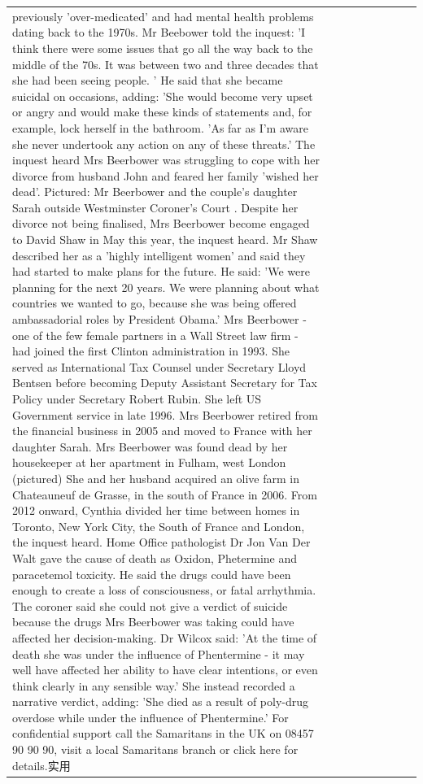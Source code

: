 \begin{table}[H]
\begin{tabular}{lllrlllll}
previously 'over-medicated' and had mental health problems dating back to the 1970s. Mr Beebower told the inquest: 'I think there were some issues that go all the way back to the middle of the 70s. It was between two and three decades that she had been seeing people. ' He said that she became suicidal on occasions, adding: 'She would become very upset or angry and would make these kinds of statements and, for example, lock herself in the bathroom. 'As far as I'm aware she never undertook any action on any of these threats.' The inquest heard Mrs Beerbower was struggling to cope with her divorce from husband John and feared her family 'wished her dead'. Pictured: Mr Beerbower and the couple's daughter Sarah outside Westminster Coroner's Court . Despite her divorce not being finalised, Mrs Beerbower become engaged to David Shaw in May this year, the inquest heard. Mr Shaw described her as a 'highly intelligent women' and said they had started to make plans for the future. He said: 'We were planning for the next 20 years. We were planning about what countries we wanted to go, because she was being offered ambassadorial roles by President Obama.' Mrs Beerbower - one of the few female partners in a Wall Street law firm - had joined the first Clinton administration in 1993. She served as International Tax Counsel under Secretary Lloyd Bentsen before becoming Deputy Assistant Secretary for Tax Policy under Secretary Robert Rubin. She left US Government service in late 1996. Mrs Beerbower retired from the financial business in 2005 and moved to France with her daughter Sarah. Mrs Beerbower was found dead by her housekeeper at her apartment in Fulham, west London (pictured) She and her husband acquired an olive farm in Chateauneuf de Grasse, in the south of France in 2006. From 2012 onward, Cynthia divided her time between homes in Toronto, New York City, the South of France and London, the inquest heard. Home Office pathologist Dr Jon Van Der Walt gave the cause of death as Oxidon, Phetermine and paracetemol toxicity. He said the drugs could have been enough to create a loss of consciousness, or fatal arrhythmia. The coroner said she could not give a verdict of suicide because the drugs Mrs Beerbower was taking could have affected her decision-making. Dr Wilcox said: 'At the time of death she was under the influence of Phentermine - it may well have affected her ability to have clear intentions, or even think clearly in any sensible way.' She instead recorded a narrative verdict, adding: 'She died as a result of poly-drug overdose while under the influence of Phentermine.' For confidential support call the Samaritans in the UK on 08457 90 90 90, visit a local Samaritans branch or click here for details.实用 \\

\end{tabular}
\end{table}
